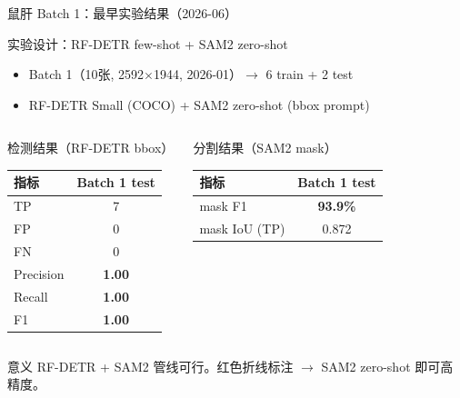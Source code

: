 \documentclass[aspectratio=169, 10pt]{beamer}
\begin{document}
\begin{frame}{鼠肝 Batch 1：最早实验结果（2026-06）}
  \begin{block}{实验设计：RF-DETR few-shot + SAM2 zero-shot}
    \begin{itemize}
      \item Batch 1（10张, 2592$\times$1944, 2026-01）$\to$ 6 train + 2 test
      \item RF-DETR Small (COCO) + SAM2 zero-shot (bbox prompt)
    \end{itemize}
  \end{block}
  \vspace{0em}
  \begin{columns}[T]
    \begin{block}{检测结果（RF-DETR bbox）}
      \begin{tabular}{lc}
        \toprule
        \textbf{指标} & \textbf{Batch 1 test} \\
        \midrule
        TP & 7 \\
        FP & 0 \\
        FN & 0 \\
        Precision & \textbf{1.00} \\
        Recall & \textbf{1.00} \\
        F1 & \textbf{1.00} \\
        \bottomrule
      \end{tabular}
    \end{block}
    \begin{block}{分割结果（SAM2 mask）}
      \begin{tabular}{lc}
        \toprule
        \textbf{指标} & \textbf{Batch 1 test} \\
        \midrule
        mask F1 & \textbf{93.9\%} \\
        mask IoU (TP) & 0.872 \\
        \bottomrule
      \end{tabular}
    \end{block}
  \end{columns}
  \vspace{0em}
  \begin{alertblock}{意义}
    RF-DETR + SAM2 管线可行。红色折线标注 $\to$ SAM2 zero-shot 即可高精度。
  \end{alertblock}
\end{frame}
\end{document}

